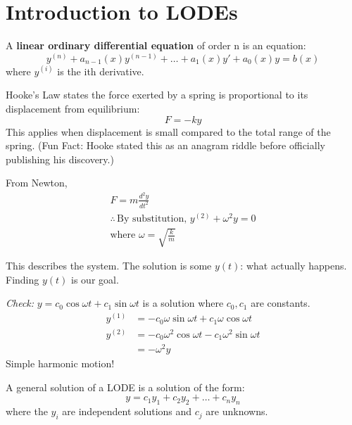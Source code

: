 \documentclass[../main.tex]{subfiles}
\begin{document}

\section{Introduction to LODEs}

\begin{definition}
    A \textbf{linear ordinary differential equation} of order n is an equation:
    \[ y^{(n)}+a_{n-1}(x)y^{(n-1)}+\dots+a_{1}(x)y'+a_{0}(x)y=b(x)  \]
    where $y^{(i)}$ is the ith derivative.
\end{definition}

\begin{example}
    Hooke's Law states the force exerted by a spring is proportional to its displacement from equilibrium:
    \[ F = -ky \]
    This applies when displacement is small compared to the total range of the spring.
    (Fun Fact: Hooke stated this as an anagram riddle before officially publishing his discovery.)

    From Newton,
    \begin{gather*}
        F = m\frac{d^2y}{dt^2} \\
        \therefore \, \text{By substitution, } y^{(2)}+\omega^2y=0 \\
        \text{where } \omega =\sqrt{ \frac{k}{m} }
    \end{gather*}

    This describes the system. The solution is some \(y(t)\): what actually happens. Finding \(y(t)\) is our goal.

    \textit{Check:} \(y=c_{0}\cos \omega t+c_{1}\sin \omega t\) is a solution where \(c_{0},c_{1}\) are constants.
    \begin{align*}
        y^{(1)} & = -c_{0}\omega \sin \omega t+c_{1}\omega \cos \omega t \\
        y^{(2)} & = -c_{0}\omega^2\cos \omega t-c_{1}\omega^2\sin \omega t \\
        & = -\omega^2 y
    \end{align*}
    Simple harmonic motion!
\end{example}

\begin{definition}
    A general solution of a LODE is a solution of the form:
    \[ y = c_{1}y_{1}+c_{2}y_{2}+\dots+c_{n}y_{n} \]
    where the \(y_{i}\) are independent solutions and \(c_{j}\) are unknowns.
\end{definition}
\end{document}
